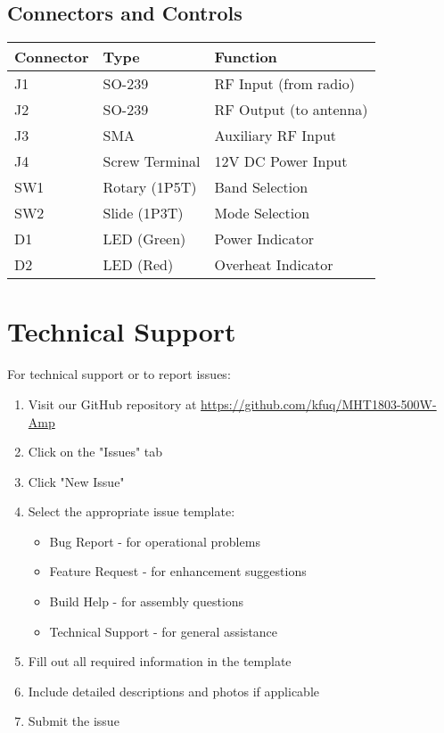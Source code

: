 \documentclass[11pt,a4paper]{article}
\begin{document}
\subsection{Connectors and Controls}
\begin{center}
\begin{tabular}{|l|l|l|}
\hline
\textbf{Connector} & \textbf{Type} & \textbf{Function} \\
\hline
J1 & SO-239 & RF Input (from radio) \\
J2 & SO-239 & RF Output (to antenna) \\
J3 & SMA & Auxiliary RF Input \\
J4 & Screw Terminal & 12V DC Power Input \\
SW1 & Rotary (1P5T) & Band Selection \\
SW2 & Slide (1P3T) & Mode Selection \\
D1 & LED (Green) & Power Indicator \\
D2 & LED (Red) & Overheat Indicator \\
\hline
\end{tabular}
\end{center}

\section{Technical Support}
For technical support or to report issues:

\begin{enumerate}
    \item Visit our GitHub repository at \url{https://github.com/kfuq/MHT1803-500W-Amp}
    \item Click on the "Issues" tab
    \item Click "New Issue"
    \item Select the appropriate issue template:
    \begin{itemize}
        \item Bug Report - for operational problems
        \item Feature Request - for enhancement suggestions
        \item Build Help - for assembly questions
        \item Technical Support - for general assistance
    \end{itemize}
    \item Fill out all required information in the template
    \item Include detailed descriptions and photos if applicable
    \item Submit the issue
\end{enumerate}
\end{document}
